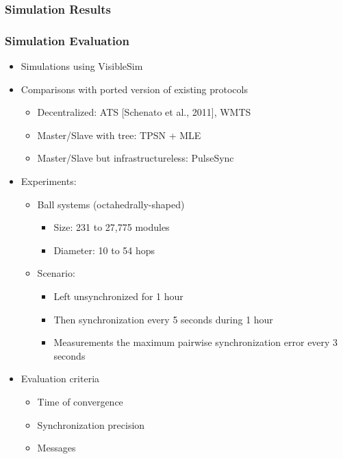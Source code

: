 \subsubsection{Simulation Results}

\begin{frame} \frametitle{Simulation Evaluation}

\begin{itemize}
	\item Simulations using VisibleSim
	\item Comparisons with ported version of existing protocols
	\begin{itemize}
		\item Decentralized: ATS [Schenato et al., 2011], WMTS \cite{he2014study} 
		\item Master/Slave with tree: TPSN + MLE \cite{leng2010clock}
		\item Master/Slave but infrastructureless: PulseSync \cite{lenzen2015pulsesync}
	\end{itemize}
	\item Experiments:
	\begin{itemize}
		\item Ball systems (octahedrally-shaped)
		\begin{itemize}
			\item Size: 231 to 27,775 modules
			\item Diameter: 10 to 54 hops
		\end{itemize}
		\item Scenario:
			\begin{itemize}
				\item Left unsynchronized for 1 hour
				\item Then synchronization every 5 seconds during 1 hour
				\item Measurements the maximum pairwise synchronization error every 3 seconds
			\end{itemize}
	\end{itemize}
	\item Evaluation criteria
	\begin{itemize}
		\item Time of convergence
		\item Synchronization precision
		\item Messages
	\end{itemize}
\end{itemize}
\end{frame}

